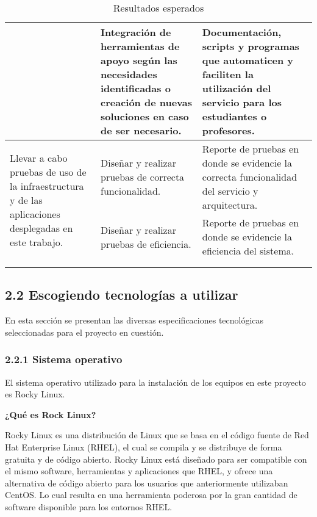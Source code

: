 \begin{doublespace}
\begin{longtable}{m{4.6cm}m{4.6cm}m{4.6cm}}
    \\ \cline{2-3}
                                                                         &
    Integración de herramientas de apoyo según las necesidades identificadas o creación de nuevas soluciones en caso de ser necesario.            &
    Documentación, scripts y programas que automaticen y faciliten la utilización del servicio para los estudiantes o profesores.                                                               \\
    \hline
    \multirow{2}{4.3cm}{Llevar a cabo pruebas de uso de la infraestructura y de las aplicaciones desplegadas en este trabajo.}            &
    Diseñar y realizar pruebas de correcta funcionalidad.                                                         &
    Reporte de pruebas en donde se evidencie la correcta funcionalidad del servicio y arquitectura.
    \\ \cline{2-3}
                                                                         &
    Diseñar y realizar pruebas de eficiencia.            &
    Reporte de pruebas en donde se evidencie la eficiencia del sistema.                                                          \\
    \hline
    \\ 
    \caption{Resultados esperados}
    \label{table:table3}
    \end{longtable}

    \subsection{2.2 Escogiendo tecnologías a utilizar}
    En esta sección se presentan las diversas especificaciones tecnológicas seleccionadas para el proyecto en cuestión.

    \subsubsection{2.2.1 Sistema operativo}
    El sistema operativo utilizado para la instalación de los equipos en este proyecto es Rocky Linux.

    \textbf{¿Qué es Rock Linux?}
    
    Rocky Linux es una distribución de Linux que se basa en el código fuente de Red Hat Enterprise Linux (RHEL), el cual se compila y se distribuye de forma gratuita y de código abierto. Rocky Linux está diseñado para ser compatible con el mismo software, herramientas y aplicaciones que RHEL, y ofrece una alternativa de código abierto para los usuarios que anteriormente utilizaban CentOS. Lo cual resulta en una herramienta poderosa por la gran cantidad de software disponible para los entornos RHEL.


\end{doublespace}
